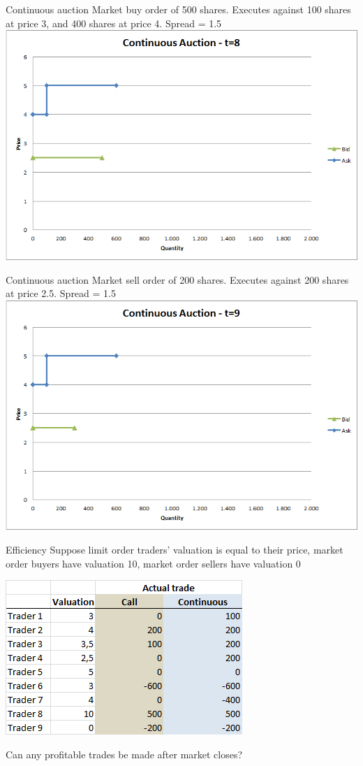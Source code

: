 \begin{frame}{Continuous auction}
	Market buy order of 500 shares. Executes against 100 shares at price 3, and 400 shares at price 4. Spread = 1.5
	\center
	\includegraphics[width=.75\linewidth]{pics/Continuous_t8}
\end{frame}


\begin{frame}{Continuous auction}
	Market sell order of 200 shares. Executes against 200 shares at price 2.5. Spread = 1.5
	\center
	\includegraphics[width=.75\linewidth]{pics/Continuous_t9}
\end{frame}


\begin{frame}{Efficiency}
	Suppose limit order traders' valuation is equal to their price, market order buyers have valuation 10, market order sellers have valuation 0
	
	{\center
		\includegraphics[width=.5\linewidth]{pics/Efficiency}
	\\
	}
	
	Can any profitable trades be made after market closes?
\end{frame}


